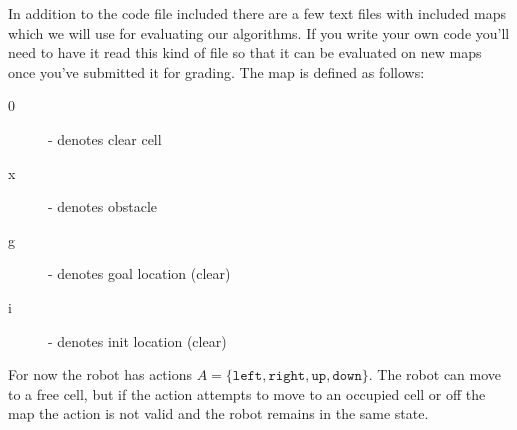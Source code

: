 \documentclass[11pt]{hermans-hw}
\begin{document}
In addition to the code file included there are a few text files with included maps which we will use for evaluating our algorithms. If you write your own code you'll need to have it read this kind of file so that it can be evaluated on new maps once you've submitted it for grading. The map is defined as follows:
\begin{description}
\item[0] - denotes clear cell
\item[x] - denotes obstacle
\item[g] - denotes goal location (clear)
\item[i] - denotes init location (clear)
\end{description}

For now the robot has actions \(A = \{\texttt{left}, \texttt{right}, \texttt{up}, \texttt{down}\}\). The robot can move to a free cell, but if the action attempts to move to an occupied cell or off the map the action is not valid and the robot remains in the same state.
\end{document}
